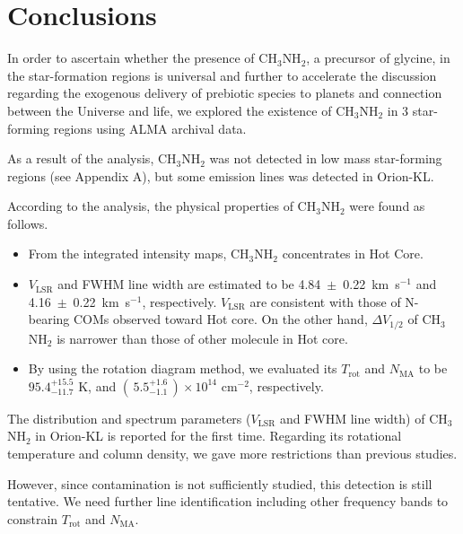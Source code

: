 \chapter{Conclusions
  \label{chap:conclusions}}

In order to ascertain whether the presence of CH$_3$NH$_2$, a precursor of glycine, in the star-formation regions is universal  
 and further to accelerate the discussion regarding the exogenous delivery of 
prebiotic species to planets and connection between the Universe and life,
we explored the existence of CH$_3$NH$_2$ in 3 star-forming regions using ALMA archival data.

As a result of the analysis, CH$_3$NH$_2$ was not detected in low mass star-forming regions 
(see Appendix A), but some emission lines was detected in Orion-KL.

According to the analysis, the physical properties of CH$_3$NH$_2$ were found as follows.
\begin{itemize}
\item From the integrated intensity maps, CH$_3$NH$_2$ concentrates in Hot Core.
\item $V_{\mathrm{LSR}}$ and FWHM line width are estimated to be 4.84~$\pm$~0.22~km~s$^{-1}$ 
and 4.16~$\pm$~0.22~km~s$^{-1}$, respectively. $V_{\mathrm{LSR}}$ are consistent with 
those of N-bearing COMs observed toward Hot core.
On the other hand, $\Delta V_{1/2}$ of CH$_3$NH$_2$ is narrower than those of other molecule in Hot core.
\item By using the rotation diagram method, we evaluated its $T_{\mathrm{rot}}$ and $N_{\mathrm{MA}}$ to be $95.4^{+15.5}_{-11.7} \,\,\mathrm{K}$, and $ (\,5.5^{+1.6}_{-1.1}\,) \times 10^{14} \,\,\mathrm{cm^{-2}}$,  respectively.
\end{itemize}

The distribution and spectrum parameters ($V_{\mathrm{LSR}}$ and FWHM line width) of CH$_3$NH$_2$ in Orion-KL is reported for the first time.
Regarding its rotational temperature and column density, we gave more restrictions than previous studies.

However, since contamination is not sufficiently studied, this detection is still tentative.
We need further line identification including other frequency bands to constrain $T_{\mathrm{rot}}$ and $N_{\mathrm{MA}}$.



